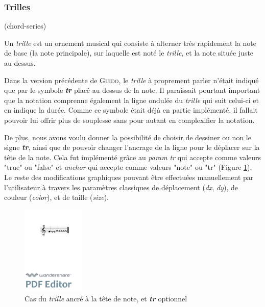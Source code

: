 \documentclass{article}
\newenvironment{gmncode}	{\vspace{-2mm}\small\verbatim}{\endverbatim\vspace{-2mm}}
\newcommand{\guido}			{\textsc{Guido}}
\begin{document}
\subsubsection{Trilles}\label{subsubsec:trilles}


\begin{gmncode}
(chord-series)
\end{gmncode}

Un \emph{trille} est \og{}un ornement musical qui consiste à alterner très rapidement la note de base (la note principale), sur laquelle est noté le \emph{trille}, et la note située juste au-dessus\fg{}.

Dans la version précédente de \guido, le \emph{trille} à proprement parler n'était indiqué que par le symbole \textit{\textbf{tr}} placé au dessus de la note. Il paraissait pourtant important que la notation comprenne également la ligne ondulée du \emph{trille} qui suit celui-ci et en indique la durée. Comme ce symbole était déjà en partie implémenté, il fallait pouvoir lui offrir plus de souplesse sans pour autant en complexifier la notation.


De plus, nous avons voulu donner la possibilité de choisir de dessiner ou non le signe \textit{\textbf{tr}}, ainsi que de pouvoir changer l'ancrage de la ligne pour le déplacer sur la tête de la note. Cela fut implémenté grâce au \emph{param} \emph{tr} qui accepte comme valeurs "true" ou "false" et \emph{anchor} qui accepte comme valeurs "note" ou "tr" (Figure \ref{fig:trillanchor}). Le reste des modifications graphiques pouvant être effectuées manuellement par l'utilisateur à travers les paramètres classiques de déplacement (\textit{dx}, \textit{dy}), de couleur (\textit{color}), et de taille (\textit{size}).

\begin{figure}[h]
\centering
\begin{gmncode}
[ \trill<tr="false", anchor="note">
( {g} {a/2} ) ]
\end{gmncode}
\includegraphics[width=30mm]{img/trillanchor.pdf}
\caption{Cas du \emph{trille} ancré à la tête de note, et \textit{\textbf{tr}} optionnel}
\label{fig:trillanchor}
\end{figure}
\end{document}
